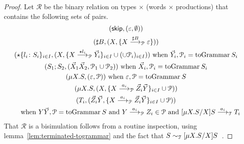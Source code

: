 \begin{proof}
  Let $\mathcal R$ be the binary relation on types $\times$ (words
  $\times$ productions) that contains the following sets of pairs.
  \begin{gather*}
    (\skipk, (\varepsilon, \emptyset))
    \\
    (\sharp B, (X, \{X \LTSderivesP[\sharp B] \varepsilon\}))
    \\
    (\star\{l_i\colon S_i\}_{i\in I}, (X, \{X \LTSderivesP[\star l_i]
    \vec Y_i\}_{i\in I} \cup (\cup \mathcal P_i)_{i\in I}))
    \text{ when } \vec Y_i,\mathcal P_i = \toGrammarf{S_i}
    \\
    (S_1;S_2, (\vec X_1\vec X_2, \mathcal P_1 \cup \mathcal P_2))
    \text{ when } \vec X_i,\mathcal P_i = \toGrammarf{S_i}
    \\
    (\mu X.S, (\varepsilon, \mathcal P))
    \text{ when } \varepsilon,\mathcal P = \toGrammarf{S}
    \\
    (\mu X.S, (X, \{X \LTSderivesP[a_i] \vec Z_i\vec Y\}_{i\in I} \cup \mathcal P))
    \\
    (T_i, (\vec Z_i\vec Y, \{X \LTSderivesP[a_i] \vec Z_i\vec Y\}_{i\in I} \cup \mathcal P))
   \\\quad
    \text{ when } Y\vec Y,\mathcal P = \toGrammarf{S}
    \text{ and } Y \LTSderivesP[a_i] Z_i \in \mathcal P 
    \text{ and } \subs{\mu X.S}{X} S \LTSderives[a_i] T_i
  \end{gather*}
  That $\mathcal R$ is a bisimulation follows from a routine inspection,
  using lemma~\ref{lem:terminated-togrammar} and the fact that
  $S \sim_\mathcal T [{\mu X.S}/{X}] S$~\cite{thiemann2016context}. 
\end{proof}




